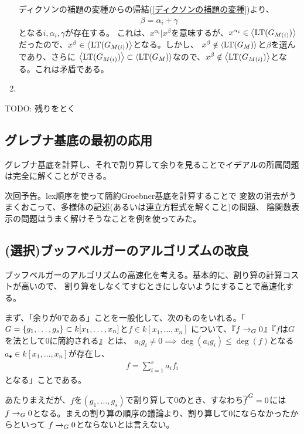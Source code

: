 \begin{enumerate}[label=(問題\arabic*)]
  ディクソンの補題の変種からの帰結(\ref{ディクソンの補題の変種})より、
  \begin{align}
    \beta = \alpha_i + \gamma
  \end{align}
  となる$i,\alpha_i,\gamma$が存在する。
  これは、$x^{\alpha_i} | x^\beta$を意味するが、$x^{\alpha_i}\in \left\langle {\rm LT}(G_{M(i)}) \right\rangle$だったので、$x^\beta \in \left\langle {\rm LT}(G_{M(i)}) \right\rangle$となる。しかし、
  $x^\beta \notin \left\langle {\rm LT}(G_M) \right\rangle$と$\beta$を選んであり、さらに
  $\left\langle {\rm LT}(G_{M(i)}) \right\rangle\subset \left\langle {\rm LT}(G_M) \right\rangle$なので、$x^\beta \notin \left\langle {\rm LT}(G_{M(i)}) \right\rangle$となる。これは矛盾である。
  \item
\end{enumerate}
TODO: 残りをとく

\subsection{グレブナ基底の最初の応用}
\label{sub:グレブナ基底の最初の応用}
グレブナ基底を計算し、それで割り算して余りを見ることでイデアルの所属問題は完全に解くことができる。

次回予告。lex順序を使って簡約Groebner基底を計算することで
変数の消去がうまくおこって、多様体の記述(あるいは連立方程式を解くこと)の問題、
陰関数表示の問題はうまく解けそうなことを例を使ってみた。

\subsection{(選択)ブッフベルガーのアルゴリズムの改良}
\label{sub:(選択)ブッフベルガーのアルゴリズムの改良}
ブッフベルガーのアルゴリズムの高速化を考える。基本的に、割り算の計算コストが高いので、
割り算をしなくてすむときにしないようにすることで高速化する。

まず、「余りが0である」ことを一般化して、次のものをいれる。「
$G=\left\{g_1,\dots,g_s\right\} \subset k[x_1,\dots,x_n]$と$f\in k[x_1,\dots,x_n]$
について、『$f \rightarrow_G 0$』『$f$は$G$を法として0に簡約される』とは、
$a_ig_i \neq 0 \implies \deg(a_i g_i) \le \deg(f)$となる$a_\bullet \in k[x_1,\dots,x_n]$が存在し、
\begin{align}
  f = \sum_{i=1}^s a_i f_i
\end{align}
となる」ことである。

あたりまえだが、$f$を$(g_1,\dots,g_s)$で割り算して0のとき、すなわち$\overline{f}^{G}=0$には$f\rightarrow_G 0$となる。まえの割り算の順序の議論より、割り算して0にならなかったからといって
$f\rightarrow_G 0$とならないとは言えない。

